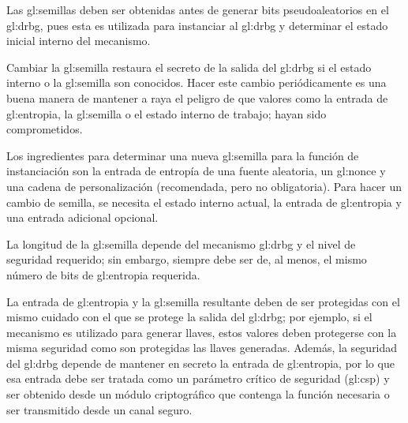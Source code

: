 %
%

Las \glspl{gl:semilla} deben ser obtenidas antes de generar bits
pseudoaleatorios en el \gls{gl:drbg}, pues esta es utilizada para instanciar al
\gls{gl:drbg} y determinar el estado inicial interno del mecanismo.

Cambiar la \gls{gl:semilla} restaura el secreto de la salida del \gls{gl:drbg}
si el estado interno o la \gls{gl:semilla} son conocidos. Hacer este cambio
periódicamente es una buena manera de mantener a raya el peligro de que valores
como la entrada de \gls{gl:entropia}, la \gls{gl:semilla} o el estado interno
de trabajo; hayan sido comprometidos.

Los ingredientes para determinar una nueva \gls{gl:semilla} para la función de
instanciación son la entrada de entropía de una fuente aleatoria, un
\gls{gl:nonce} y una cadena de personalización (recomendada, pero no
obligatoria). Para hacer un cambio de semilla, se necesita el estado interno
actual, la entrada de \gls{gl:entropia} y una entrada adicional opcional.

La longitud de la \gls{gl:semilla} depende del mecanismo \gls{gl:drbg} y el
nivel de seguridad requerido; sin embargo, siempre debe ser de, al menos, el
mismo número de bits de \gls{gl:entropia} requerida.

La entrada de \gls{gl:entropia} y la \gls{gl:semilla} resultante deben de ser
protegidas con el mismo cuidado con el que se protege la salida del
\gls{gl:drbg}; por ejemplo, si el mecanismo es utilizado para generar llaves,
estos valores deben protegerse con la misma seguridad como son protegidas las
llaves generadas. Además, la seguridad del \gls{gl:drbg} depende de mantener
en secreto la entrada de \gls{gl:entropia}, por lo que esa entrada debe ser
tratada como un parámetro crítico de seguridad (\gls{gl:csp}) y ser obtenido
desde un módulo criptográfico que contenga la función necesaria o ser
transmitido desde un canal seguro.

